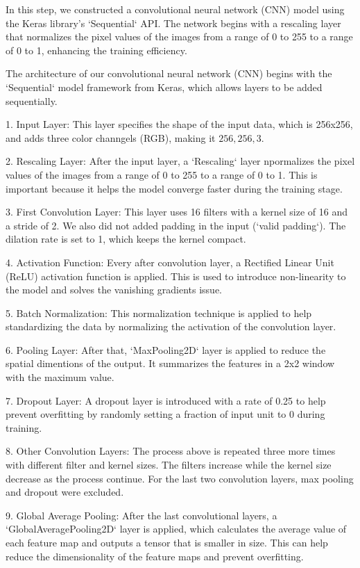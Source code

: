 In this step, we constructed a convolutional neural network (CNN) model using the Keras library's `Sequential` API. The network begins with a rescaling layer that normalizes the pixel values of the images from a range of 0 to 255 to a range of 0 to 1, enhancing the training efficiency. 

The architecture of our convolutional neural network (CNN) begins with the `Sequential` model framework from Keras, which allows layers to be added sequentially. 

1. Input Layer: This layer specifies the shape of the input data, which is 256x256, and adds three color channgels (RGB), making it \(256, 256, 3\).

2. Rescaling Layer: After the input layer, a `Rescaling` layer npormalizes the pixel values of the images from a range of 0 to 255 to a range of 0 to 1. This is important because it helps the model converge faster during the training stage.

3. First Convolution Layer: This layer uses 16 filters with a kernel size of 16 and a stride of 2. We also did not added padding in the input (`valid padding`). The dilation rate is set to 1, which keeps the kernel compact.

4. Activation Function: Every after convolution layer, a Rectified Linear Unit (ReLU) activation function is applied. This is used to introduce non-linearity to the model and solves the vanishing gradients issue.

5. Batch Normalization: This normalization technique is applied to help standardizing the data by normalizing the activation of the convolution layer.

6. Pooling Layer: After that, `MaxPooling2D` layer is applied to reduce the spatial dimentions of the output. It summarizes the features in a 2x2 window with the maximum value.

7. Dropout Layer: A dropout layer is introduced with a rate of 0.25 to help prevent overfitting by randomly setting a fraction of input unit to 0 during training.

8. Other Convolution Layers: The process above is repeated three more times with different filter and kernel sizes. The filters increase while the kernel size decrease as the process continue. For the last two convolution layers, max pooling and dropout were excluded.

9. Global Average Pooling: After the last convolutional layers, a `GlobalAveragePooling2D` layer is applied, which calculates the average value of each feature map and outputs a tensor that is smaller in size. This can help reduce the dimensionality of the feature maps and prevent overfitting. 

